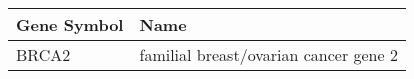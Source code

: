 \begin{tabular}{ll}
\toprule
Gene Symbol &                                  Name \\
\midrule
      BRCA2 & familial breast/ovarian cancer gene 2 \\
\bottomrule
\end{tabular}
